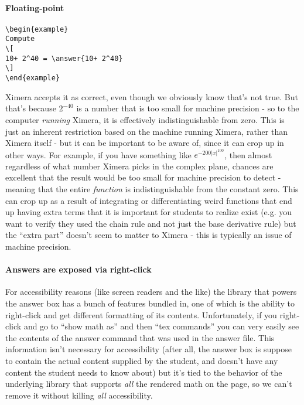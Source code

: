 \documentclass{ximera}
\begin{document}
\paragraph{Floating-point}
\begin{verbatim}
\begin{example}
Compute
\[
10+ 2^40 = \answer{10+ 2^40}
\]
\end{example}
\end{verbatim}

Ximera accepts it as correct, even though we obviously know that's not
true. But that's because $2^{-40}$ is a number that is too small for machine
precision - so to the computer \textit{running} Ximera, it is effectively
indistinguishable from zero. This is just an inherent restriction based on the
machine running Ximera, rather than Ximera itself - but it can be important to
be aware of, since it can crop up in other ways. For example, if you have
something like $e^{-200|x|^{100}}$, then almost regardless of what number
Ximera picks in the complex plane, chances are excellent that the result would
be too small for machine precision to detect - meaning that the entire
\textit{function} is indistinguishable from the constant zero. This can crop up
as a result of integrating or differentiating weird functions that end up
having extra terms that it is important for students to realize exist (e.g. you
want to verify they used the chain rule and not just the base derivative rule)
but the ``extra part'' doesn't seem to matter to Ximera - this is typically an
issue of machine precision.

\paragraph{Answers are exposed via right-click}

For accessibility reasons (like screen readers and the like) the library
that powers the answer box has a bunch of features bundled in, one of which is
the ability to right-click and get different formatting of its contents.
Unfortunately, if you right-click and go to ``show math as'' and then ``tex
commands'' you can very easily see the contents of the answer command that was
used in the answer file. This information isn't necessary for accessibility
(after all, the answer box is suppose to contain the actual content supplied by
the student, and doesn't have any content the student needs to know about) but
it's tied to the behavior of the underlying library that supports \textit{all}
the rendered math on the page, so we can't remove it without killing
\textit{all} accessibility.
\end{document}
